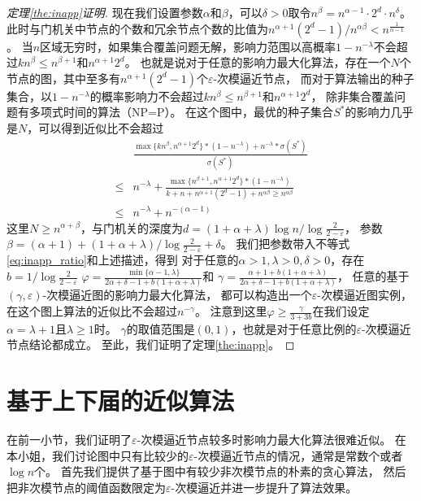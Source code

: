 \begin{proof}[定理\ref{the:inapp}证明]
现在我们设置参数$\alpha$和$\beta$，可以$\delta>0$取令$n^{\beta} = n^{\alpha-1} \cdot 2^d \cdot n^{\delta}$。
此时与门机关中节点的个数和冗余节点个数的比值为$n^{\alpha+1}(2^d-1) / n^{\alpha\beta} < n^{\frac{1}{\alpha-1}}$。
当$n$区域无穷时，如果集合覆盖问题无解，影响力范围以高概率$1-n^{-\lambda}$不会超过$kn^{\beta} \leq n^{\beta+1}$和$n^{\alpha+1}2^d$。
也就是说对于任意的影响力最大化算法，存在一个$N$个节点的图，其中至多有$n^{\alpha+1}(2^d-1)$个$\varepsilon$-次模逼近节点，
而对于算法输出的种子集合，以$1-n^{-\lambda}$的概率影响力不会超过$kn^{\beta} \leq n^{\beta+1}$和$n^{\alpha+1}2^d$，
除非集合覆盖问题有多项式时间的算法（NP=P）。
在这个图中，最优的种子集合$S^*$的影响力几乎是$N$，可以得到近似比不会超过
\begin{equation}
\label{eq:inapp_ratio}
\begin{array}{ll}
& \frac{\max\{kn^{\beta}, n^{\alpha+1}2^d\} * (1-n^{-\lambda}) + n^{-\lambda} * \sigma(S^*)}{\sigma(S^*)} \\
\leq & n^{-\lambda} + 
\frac{\max\{n^{\beta+1}, n^{\alpha+1}2^d\} * (1-n^{-\lambda})}
{k+n+n^{\alpha+1}(2^d-1)+n^{\alpha\beta} \geq n^{\alpha\beta}} \\
\leq & n^{-\lambda} + n^{-(\alpha-1)}
\end{array}
\end{equation}
这里$N \geq n^{\alpha+\beta}$，与门机关的深度为$d = (1+\alpha+\lambda)\log n / \log{\frac{2}{2-\varepsilon}}$，
参数$\beta = (\alpha+1) + (1+\alpha+\lambda) / \log{\frac{2}{2-\varepsilon}} + \delta$。
我们把参数带入不等式\ref{eq:inapp_ratio}和上述描述，得到
对于任意的$\alpha>1, \lambda>0, \delta>0$，存在$b = 1/\log{\frac{2}{2-\varepsilon}}$
$\varphi= \frac{ \min\{\alpha-1, \lambda\}}{2\alpha+\delta-1+b(1+\alpha+\lambda)}$和
$\gamma =\frac{\alpha+1+b(1+\alpha+\lambda)}{2\alpha+\delta-1+b(1+\alpha+\lambda)}$，
任意的基于$(\gamma,\varepsilon)$-次模逼近图的影响力最大化算法，
都可以构造出一个$\varepsilon$-次模逼近图实例，在这个图上算法的近似比不会超过$n^{-\gamma}$。
注意到这里$\varphi \geq \frac{\gamma}{3+3b}$在我们设定 $\alpha=\lambda+1$且$\lambda \geq 1$时。
$\gamma$的取值范围是$(0,1)$，也就是对于任意比例的$\varepsilon$-次模逼近节点结论都成立。
至此，我们证明了定理\ref{the:inapp}。
\end{proof}

\section{基于上下届的近似算法}
在前一小节，我们证明了$\varepsilon$-次模逼近节点较多时影响力最大化算法很难近似。
在本小姐，我们讨论图中只有比较少的$\varepsilon$-次模逼近节点的情况，通常是常数个或者$\log n$个。
首先我们提供了基于图中有较少非次模节点的朴素的贪心算法，
然后把非次模节点的阈值函数限定为$\varepsilon$-次模逼近并进一步提升了算法效果。


